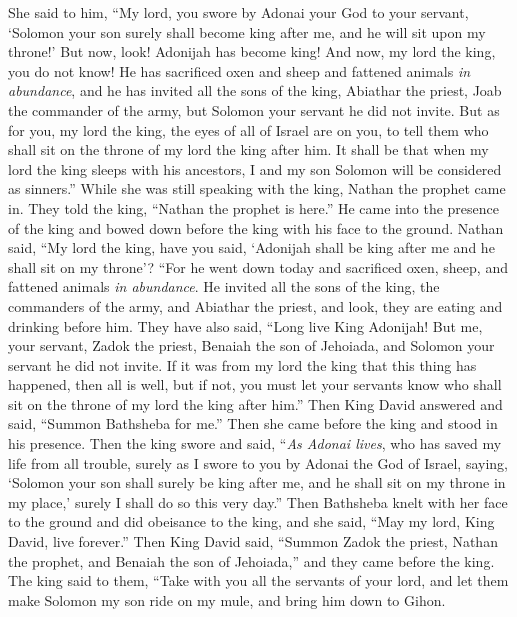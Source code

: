\begin{biblechapter}
\verse She said to him, “My lord, you swore by Adonai your God to your servant, ‘Solomon your son surely shall become king after me, and he will sit upon my throne!’
\verse But now, look! Adonijah has become king! And now, my lord the king, you do not know!
\verse He has sacrificed oxen and sheep and fattened animals \textit{in abundance}, and he has invited all the sons of the king, Abiathar the priest, Joab the commander of the army, but Solomon your servant he did not invite.
\verse But as for you, my lord the king, the eyes of all of Israel are on you, to tell them who shall sit on the throne of my lord the king after him.
\verse It shall be that when my lord the king sleeps with his ancestors, I and my son Solomon will be considered as sinners.”
\verse While she was still speaking with the king, Nathan the prophet came in.
\verse They told the king, “Nathan the prophet is here.” He came into the presence of the king and bowed down before the king with his face to the ground.
\verse Nathan said, “My lord the king, have you said, ‘Adonijah shall be king after me and he shall sit on my throne’?
\verse “For he went down today and sacrificed oxen, sheep, and fattened animals \textit{in abundance}. He invited all the sons of the king, the commanders of the army, and Abiathar the priest, and look, they are eating and drinking before him. They have also said, “Long live King Adonijah!
\verse But me, your servant, Zadok the priest, Benaiah the son of Jehoiada, and Solomon your servant he did not invite.
\verse If it was from my lord the king that this thing has happened, then all is well, but if not, you must let your servants know who shall sit on the throne of my lord the king after him.”
\verse Then King David answered and said, “Summon Bathsheba for me.” Then she came before the king and stood in his presence.
\verse Then the king swore and said, “\textit{As Adonai lives}, who has saved my life from all trouble,
\verse surely as I swore to you by Adonai the God of Israel, saying, ‘Solomon your son shall surely be king after me, and he shall sit on my throne in my place,’ surely I shall do so this very day.”
\verse Then Bathsheba knelt with her face to the ground and did obeisance to the king, and she said, “May my lord, King David, live forever.”
 Then King David said, “Summon Zadok the priest, Nathan the prophet, and Benaiah the son of Jehoiada,” and they came before the king.
\verse The king said to them, “Take with you all the servants of your lord, and let them make Solomon my son ride on my mule, and bring him down to Gihon.

\end{biblechapter}

